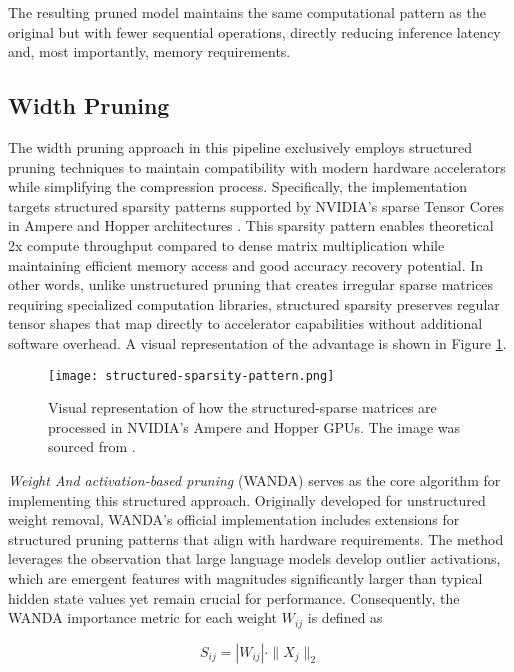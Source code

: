 The resulting pruned model maintains the same computational pattern as the original but with fewer sequential operations, directly reducing inference latency and, most importantly, memory requirements.

\subsection{Width Pruning} \label{wanda}

The width pruning approach in this pipeline exclusively employs structured pruning techniques to maintain compatibility with modern hardware accelerators while simplifying the compression process. Specifically, the implementation targets structured sparsity patterns supported by NVIDIA's sparse Tensor Cores in Ampere and Hopper architectures \cite{nvidia-width}. This sparsity pattern enables theoretical 2x compute throughput compared to dense matrix multiplication while maintaining efficient memory access and good accuracy recovery potential. In other words, unlike unstructured pruning that creates irregular sparse matrices requiring specialized computation libraries, structured sparsity preserves regular tensor shapes that map directly to accelerator capabilities without additional software overhead. A visual representation of the advantage is shown in Figure \ref{fig:nvidia-width}.

\begin{figure}[htbp]
    \centering
    \texttt{[image: structured-sparsity-pattern.png]}
    \caption[Advantages of Structured Sparsity]{Visual representation of how the structured-sparse matrices are processed in NVIDIA's Ampere and Hopper GPUs. The image was sourced from \cite{nvidia-width}.}
    \label{fig:nvidia-width}
\end{figure}

\textit{Weight And activation-based pruning} (WANDA) \cite{wanda} serves as the core algorithm for implementing this structured approach. Originally developed for unstructured weight removal, WANDA's official implementation includes extensions for structured pruning patterns that align with hardware requirements. The method leverages the observation that large language models develop outlier activations, which are emergent features with magnitudes significantly larger than typical hidden state values yet remain crucial for performance. Consequently, the WANDA importance metric for each weight $W_{ij}$ is defined as

\begin{equation}
S_{ij} = |W_{ij}| \cdot \|X_j\|_2
\end{equation}

